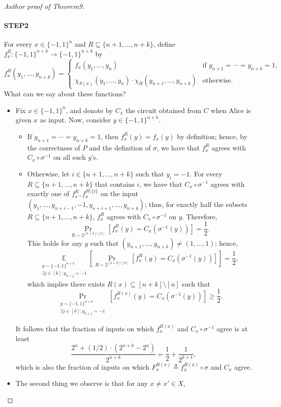 \begin{proof}[Author proof of Theorem9]
\paragraph{STEP2}
For every $x\in\{-1,1\}^n$ and $R\subseteq\{n+1,\ldots,n+k\}$, define $f_x^R:\{-1,1\}^{n+k}\to\{-1,1\}^{n+k}$ by
\[f_x^R(y_1,\ldots,y_{n+k})=\begin{cases}f_x(y_1,\ldots,y_n)&\text{if }y_{n+1}=\cdots=y_{n+k}=1,\\\chi_{S(x)}(y_1,\ldots,y_n)\cdot\chi_R(y_{n+1},\ldots,y_{n+k})&\text{otherwise}.\end{cases}\]
What can we say about these functions?
\begin{itemize}
\item Fix $x\in\{-1,1\}^n$, and denote by $C_x$ the circuit obtained from $C$ when Alice is given $x$ as input. Now, consider $y\in\{-1,1\}^{n+k}$.
\begin{itemize}
\item If $y_{n+1}=\cdots=y_{n+k}=1$, then $f_x^R(y)=f_x(y)$ by definition; hence, by the correctness of $P$ and the definition of $\sigma$, we have that $f_x^R$ agrees with $C_x\circ\sigma^{-1}$ on all such $y$'s.
\item Otherwise, let $i\in\{n+1,\ldots,n+k\}$ such that $y_i=-1$. For every $R\subseteq\{n+1,\ldots,n+k\}$ that contains $i$, we have that $C_x\circ\sigma^{-1}$ agrees with exactly one of $f_x^R,f_x^{R\setminus\{i\}}$ on the input $(y_1,\ldots,y_{n+i-1},-1,y_{n+i+1},\ldots,y_{n+k})$; thus, for exactly half the subsets $R\subseteq\{n+1,\ldots,n+k\}$, $f_x^R$ agrees with $C_x\circ\sigma^{-1}$ on $y$. Therefore,
\[\Pr_{R\sim2^{[n+k]\setminus[n]}}[f_x^R(y)=C_x(\sigma^{-1}(y))]=\frac12.\]
This holds for any $y$ such that $(y_{n+1},\ldots,y_{n+k})\ne(1,\ldots,1)$; hence,
\[\underset{\substack{y\sim\{-1,1\}^{n+k}\\\exists j\in[k]:y_{n+j}=-1}}{\mathbb E}\left[\Pr_{R\sim2^{[n+k]\setminus[n]}}[f_x^R(y)=C_x(\sigma^{-1}(y))]\right]=\frac12,\]
which implies there exists $R(x)\subseteq[n+k]\setminus[n]$ such that
\[\Pr_{\substack{y\sim\{-1,1\}^{n+k}\\\exists j\in[k]:y_{n+j}=-1}}[f_x^{R(x)}(y)=C_x(\sigma^{-1}(y))]\geq\frac12.\]
\end{itemize}
It follows that the fraction of inputs on which $f_x^{R(x)}$ and $C_x\circ\sigma^{-1}$ agree is at least
\[\frac{2^n+(1/2)\cdot(2^{n+k}-2^n)}{2^{n+k}}=\frac12+\frac1{2^{k+1}},\]
which is also the fraction of inputs on which $F_x^{R(x)}\triangleq f_x^{R(x)}\circ\sigma$ and $C_x$ agree.
\item The second thing we observe is that for any $x\ne x'\in X$,

\end{itemize}
\end{proof}
